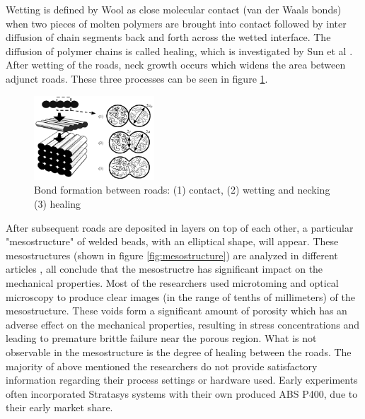 Wetting is defined by Wool \cite{WoolStrenghtInterfaces} as close molecular contact (van der Waals bonds) when two pieces of molten polymers are brought into contact followed by inter diffusion of chain segments back and forth across the wetted interface. The diffusion of polymer chains is called healing, which is investigated by Sun et al \cite{Sun2008}. After wetting of the roads, neck growth occurs which widens the area between adjunct roads. These three processes can be seen in figure \ref{fig:polymerwelding}. 

\begin{figure}[H]
    \centering
    \includegraphics[width=0.4\textwidth]{chapter_2/figures/polymerwelding.PNG}
    \caption{Bond formation between roads: (1) contact, (2) wetting and necking (3) healing  \cite{Sun2008}}
    \label{fig:polymerwelding}
\end{figure}

After subsequent roads are deposited in layers on top of each other, a particular "mesostructure" of welded beads, with an elliptical shape, will appear. These mesostructures (shown in figure \ref{fig:mesostructure}) are analyzed in different articles \cite{Somireddy2017MechanicalMesostructure}
\cite{Somireddy2018DevelopmentFDM}
\cite{Li2002CompositeProperties} \cite{Rodriguez2001MechanicalInvestigation}
\cite{Rodriguez2003MechanicalModeling}
\cite{Blok2018AnComposites} 
\cite{Sun2008}, all conclude that the mesostructre has significant impact on the mechanical properties.
Most of the researchers used microtoming and optical microscopy to produce clear images (in the range of tenths of millimeters) of the mesostructure. These voids form a significant amount of porosity which has an adverse effect on the mechanical properties, resulting in stress concentrations and leading to premature brittle failure  near the porous region.  What is not observable in the mesostructure is the degree of healing between the roads. 
The majority of above mentioned the researchers do not provide satisfactory information regarding their process settings or hardware used. Early experiments often incorporated Stratasys systems with their own produced ABS P400, due to their early market share. 

